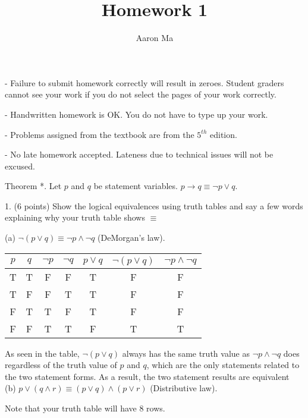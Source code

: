\documentclass{article}
\title{Homework 1}
\author{Aaron Ma}
\begin{document}
\maketitle
- Failure to submit homework correctly will result in zeroes. Student graders cannot see your work if you do not select the pages of your work correctly.

- Handwritten homework is OK. You do not have to type up your work.

- Problems assigned from the textbook are from the $5^{th}$ edition.

- No late homework accepted. Lateness due to technical issues will not be excused.

Theorem *. Let $p$ and $q$ be statement variables. $p \rightarrow q \equiv \neg p \vee q$.

1. (6 points) Show the logical equivalences using truth tables and say a few words explaining why your truth table shows $\equiv$

(a) $\neg(p \vee q) \equiv \neg p \wedge \neg q$ (DeMorgan's law).


\begin{center}
    \begin{tabular}{c|c|c|c|c|c|c}
     $p$ & $q$ & $\neg p$ & $\neg q$ & $p \vee q $ & $\neg (p \vee q)$ & $\neg p  \wedge \neg q$\\
     \hline
     T & T & F & F & T & F & F\\
     T & F & F & T & T & F & F\\
     F & T & T & F & T & F & F\\
     F & F & T & T & F & T & T\\
    \end{tabular}

\end{center}

As seen in the table, $\neg(p \vee q)$ always has the same truth value as $\neg p \wedge \neg q$ does regardless of the truth value of $p$ and $q$, which are the only statements related to the two statement forms. As a result, the two statement results are equivalent
\\


(b) $p \vee(q \wedge r) \equiv(p \vee q) \wedge(p \vee r)$ (Distributive law).

Note that your truth table will have 8 rows.
\end{document}

